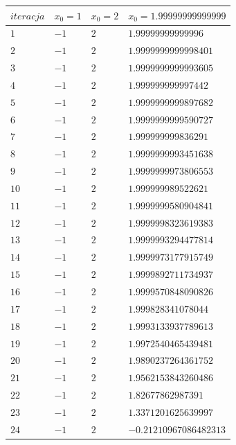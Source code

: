 \documentclass{article}
\begin{document}
\begin{center}
	\begin{tabular}{|p{2cm}|p{2cm}|p{2cm}|p{}| } \hline
		\textbf{$iteracja$} & \textbf{$x_{0}=1$} & \textbf{$x_{0}=2$} & \textbf{$x_{0}=1.99999999999999$}  \\
		\hline
		$1$ & $-1$ & $2$ & $1.99999999999996$  \\ 
		\hline
		$2$ & $-1$ & $2$ & $1.9999999999998401$  \\ 
		\hline
		$3$ & $-1$ & $2$ & $1.9999999999993605$  \\ 
		\hline
		$4$ & $-1$ & $2$ & $1.999999999997442$  \\ 
		\hline
		$5$ & $-1$ & $2$ & $1.9999999999897682$  \\ 
		\hline
		$6$ & $-1$ & $2$ & $1.9999999999590727$  \\ 
		\hline
		$7$ & $-1$ & $2$ & $1.999999999836291$  \\ 
		\hline
		$8$ & $-1$ & $2$ & $1.9999999993451638$  \\ 
		\hline
		$9$ & $-1$ & $2$ & $1.9999999973806553$  \\ 
		\hline
		$10$ & $-1$ & $2$ & $1.999999989522621$  \\ 
		\hline
		$11$ & $-1$ & $2$ & $1.9999999580904841$  \\ 
		\hline
		$12$ & $-1$ & $2$ & $1.9999998323619383$  \\ 
		\hline
		$13$ & $-1$ & $2$ & $1.9999993294477814$  \\ 
		\hline
		$14$ & $-1$ & $2$ & $1.9999973177915749$  \\ 
		\hline
		$15$ & $-1$ & $2$ & $1.9999892711734937$  \\ 
		\hline
		$16$ & $-1$ & $2$ & $1.9999570848090826$  \\ 
		\hline
		$17$ & $-1$ & $2$ & $1.999828341078044$  \\ 
		\hline
		$18$ & $-1$ & $2$ & $1.9993133937789613$  \\ 
		\hline
		$19$ & $-1$ & $2$ & $1.9972540465439481$  \\ 
		\hline
		$20$ & $-1$ & $2$ & $1.9890237264361752$  \\ 
		\hline
		$21$ & $-1$ & $2$ & $1.9562153843260486$  \\ 
		\hline
		$22$ & $-1$ & $2$ & $1.82677862987391$  \\ 
		\hline
		$23$ & $-1$ & $2$ & $1.3371201625639997$  \\ 
		\hline
		$24$ & $-1$ & $2$ & $-0.21210967086482313$  \\ 

\end{tabular}
\end{center}
\end{document}
